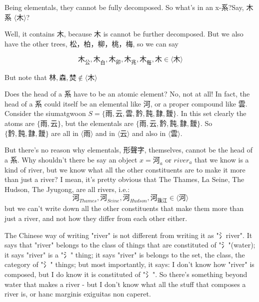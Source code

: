 Being elementals, they cannot be fully decomposed. So what's in an x-系?Say, 木系 $\langle \text{木} \rangle$?

Well, it contains $\text{木}$, because $\text{木}$ is cannot be further decomposed. But we also have the other trees, 松，柏，柳，桃，梅, so we can say 

$$\text{木}_{\text{公}},\text{木}_{\text{白}},\text{木}_{\text{卯}},\text{木}_{\text{兆}},\text{木}_{\text{每}},  \text{木} \in \langle \text{木} \rangle$$



But note that $\text{林}, \text{森},  \text{焚} \not\in \langle \text{木} \rangle$



Does the head of a 系 have to be an atomic element? No, not at all! In fact, the head of a 系 could itself be an elemental like 河, or a proper compound like 雲. Consider the siumatgwoon $S = \{\text{雨}, \text{云}, \text{雲}, \text{霒}, \text{霕}, \text{霴}, \text{靉}\}$. In this set clearly the atoms are $\{\text{雨}, \text{云}\}$, but the elementals are $\{\text{雨}, \text{云}, \text{霒}, \text{霕}, \text{霴}, \text{靉}\}$. So $\{\text{霒}, \text{霕}, \text{霴}, \text{靉}\}$ are all in $\langle \text{雨} \rangle$ and in $\langle \text{云} \rangle$ and also in $\langle \text{雲} \rangle$.

But there's no reason why elementals, 形聲字, themselves, cannot be the head of a 系. Why shouldn't there be say an object $x=\text{河}_{a}$ or $river_{a}$ that we know is a kind of river, but we know what all the other constituents are to make it more than just a river? I mean, it's pretty obvious that The Thames, La Seine, The Hudson, The Jyugong, are all rivers, i.e.: 
$$\text{河}_{Thames},\text{河}_{Seine},\text{河}_{Hudson},\text{河}_{\text{珠江}} \in \langle \text{河} \rangle$$
but we can't write down all the other constituents that make them more than just a river, and not how they differ from each other either.




The Chinese way of writing "river" is not different from writing it as "氵river". It says that "river" belongs to the class of things that are constituted of "氵"(water); it says "river" is a "氵" thing; it says "river" is belongs to the set, the class, the category of "氵" things; but most importantly, it says: I don't know how "river" is composed, but I do know it is constituted of "氵". So there's something beyond water that makes a river - but I don't know what all the stuff that composes a river is, or hanc marginis exiguitas non caperet.







